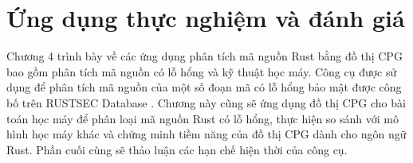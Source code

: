 \chapter{Ứng dụng thực nghiệm và đánh giá}
\label{chap:experiment}


Chương 4 trình bày về các ứng dụng phân tích mã nguồn Rust bằng đồ thị CPG bao gồm phân tích mã nguồn có lỗ hổng và kỹ thuật học máy.
Công cụ được sử dụng để phân tích mã nguồn của một số đoạn mã có lỗ hổng bảo mật được công bố trên RUSTSEC Database \cite{rustsecAboutRustSec}.
Chương này cũng sẽ ứng dụng đồ thị CPG cho bài toán học máy để phân loại mã nguồn Rust có lỗ hổng, thực hiện so sánh với mô hình học máy khác và chứng minh tiềm năng của đồ thị CPG dành cho ngôn ngữ Rust.
Phần cuối cùng sẽ thảo luận các hạn chế hiện thời của công cụ.




